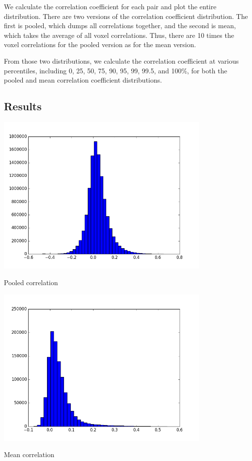 \documentclass[11pt]{article}
\begin{document}
We calculate the correlation coefficient for each pair and plot the entire
distribution.  There are two versions of the correlation coefficient 
distribution.  The first is pooled, which dumps all correlations together, 
and the second is mean, which takes the average of all voxel correlations.  
Thus, there are 10 times the voxel correlations for the pooled version as for 
the mean version.

From those two distributions, we calculate the correlation coefficient at
various percentiles, including 0, 25, 50, 75, 90, 95, 99, 99.5, and 100\%,
for both the pooled and mean correlation coefficient distributions.

\subsection{Results}

\begin{center}                                                                  
\includegraphics[height=8cm]{pooled_correlation_histogram} 
\end{center}  
Pooled correlation
\begin{center}                                                                  
\includegraphics[height=8cm]{mean_correlation_histogram} 
\end{center}  
Mean correlation
\end{document}
